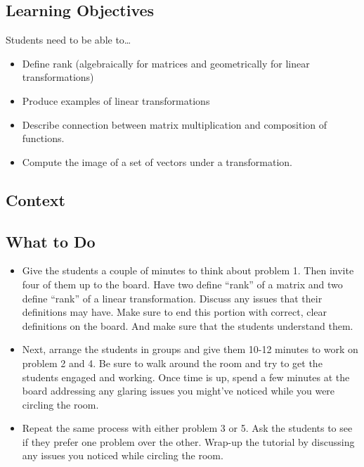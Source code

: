 \documentclass[red]{tutorial}
\theoremstyle{definition}
\theoremstyle{theorem}
\begin{document}
	\begin{instructions}
\subsection*{Learning Objectives}
	Students need to be able to\ldots
	\begin{itemize}
		\item Define rank (algebraically for matrices and geometrically for linear transformations)
		\item Produce examples of linear transformations
		\item Describe connection between matrix multiplication and composition of functions.
		\item Compute the image of a set of vectors under a transformation.
	\end{itemize}

\subsection*{Context}


\subsection*{What to Do}
  	\begin{itemize}
		\item Give the students a couple of minutes to think about
		problem 1. Then invite four of them up to the board. Have
		two define ``rank''
			of a matrix and two define ``rank'' of a linear
			transformation. Discuss any issues that their
			definitions may have. Make sure to end this
			portion with correct, clear definitions on
			the board. And make sure that the students
			understand them.

		\item Next, arrange the students in groups and give them
		10-12 minutes to work on problem 2 and 4. Be sure to
		walk around the room and try to get the students engaged
		and working. Once time is up, spend a few minutes at
		the board addressing any glaring issues you might've
		noticed while you were circling the room.

		\item Repeat the same process with either problem 3 or
		5. Ask the students to see if they prefer one problem
		over the other. Wrap-up the tutorial by discussing any
		issues you noticed while circling the room.
	\end{itemize}


\end{instructions}
\end{document}
